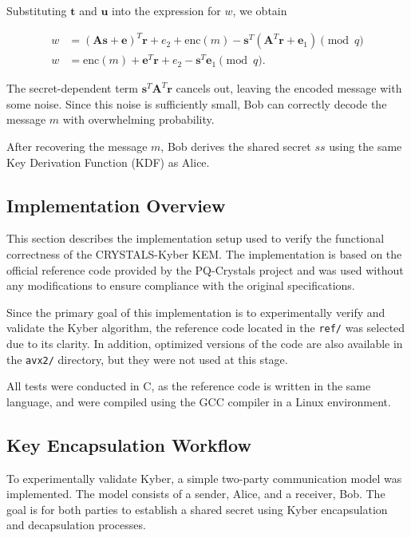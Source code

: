 \documentclass[12pt]{article}
\begin{document}
Substituting \( \mathbf{t} \) and \( \mathbf{u} \) into the expression for \( w \), we obtain

\begin{align}
w &= (\mathbf{A}\mathbf{s} + \mathbf{e})^T \mathbf{r}
    + e_2 + \mathrm{enc}(m)
    - \mathbf{s}^T(\mathbf{A}^T \mathbf{r} + \mathbf{e}_1) \pmod{q} \\
w &= \mathrm{enc}(m)
    + \mathbf{e}^T \mathbf{r}
    + e_2
    - \mathbf{s}^T \mathbf{e}_1 \pmod{q}.
\end{align}

The secret-dependent term \( \mathbf{s}^T \mathbf{A}^T \mathbf{r} \) cancels out, leaving the encoded message with some noise. Since this noise is sufficiently small, Bob can correctly decode the message \( m \) with overwhelming probability.

After recovering the message \( m \), Bob derives the shared secret \( ss \) using the same Key Derivation Function (KDF) as Alice.




\subsection{Implementation Overview}

This section describes the implementation setup used to verify the functional correctness of the CRYSTALS-Kyber KEM. The implementation is based on the official reference code provided by the PQ-Crystals project \cite{pqcrystals_ref} and was used without any modifications to ensure compliance with the original specifications.

Since the primary goal of this implementation is to experimentally verify and validate the Kyber algorithm, the reference code located in the \texttt{ref/} was selected due to its clarity. In addition, optimized versions of the code are also available in the \texttt{avx2/} directory, but they were not used at this stage.

All tests were conducted in C, as the reference code is written in the same language, and were compiled using the GCC compiler in a Linux environment. 






\subsection{Key Encapsulation Workflow}

To experimentally validate Kyber, a simple two-party communication model was implemented. The model consists of a sender, Alice, and a receiver, Bob. The goal is for both parties to establish a shared secret using Kyber encapsulation and decapsulation processes.
\end{document}
